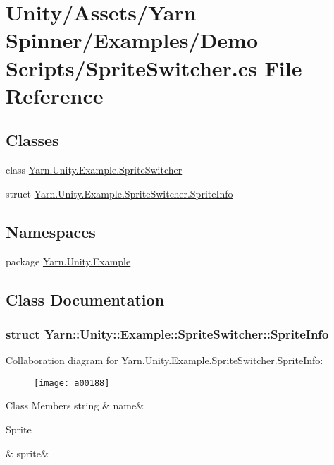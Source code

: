 \hypertarget{a00135}{\section{Unity/\-Assets/\-Yarn Spinner/\-Examples/\-Demo Scripts/\-Sprite\-Switcher.cs File Reference}
\label{a00135}
}
\subsection*{Classes}
\begin{DoxyCompactItemize}
\item 
class \hyperlink{a00087}{Yarn.\-Unity.\-Example.\-Sprite\-Switcher}
\item 
struct \hyperlink{a00087_a00184}{Yarn.\-Unity.\-Example.\-Sprite\-Switcher.\-Sprite\-Info}
\end{DoxyCompactItemize}
\subsection*{Namespaces}
\begin{DoxyCompactItemize}
\item 
package \hyperlink{a00174}{Yarn.\-Unity.\-Example}
\end{DoxyCompactItemize}


\subsection{Class Documentation}
\label{a00184}
\hypertarget{a00087_a00184}{}
\subsubsection{struct Yarn\-:\-:Unity\-:\-:Example\-:\-:Sprite\-Switcher\-:\-:Sprite\-Info}


Collaboration diagram for Yarn.\-Unity.\-Example.\-Sprite\-Switcher.\-Sprite\-Info\-:
\nopagebreak
\begin{figure}[H]
\begin{center}
\leavevmode
\texttt{[image: a00188]}
\end{center}
\end{figure}
\begin{DoxyFields}{Class Members}
\hypertarget{a00087_a3f5bca2fff413dfe075c1fcf7e58369c}{string}\label{a00087_a3f5bca2fff413dfe075c1fcf7e58369c}
&
name&
\\
\hline

\hypertarget{a00087_adc58df011dc2841837b6cf775b372061}{Sprite}\label{a00087_adc58df011dc2841837b6cf775b372061}
&
sprite&
\\
\hline

\end{DoxyFields}
